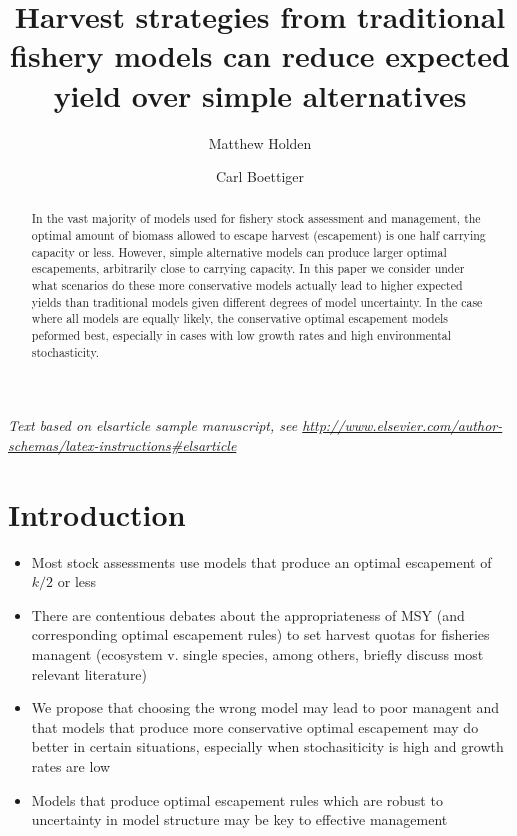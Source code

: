 \documentclass[]{elsarticle} %
\begin{document}
\begin{frontmatter}

  \title{Harvest strategies from traditional fishery models can reduce expected yield over simple alternatives}
    \author[CEED,UQ]{Matthew Holden}
    \author[UCB]{Carl Boettiger}
	\address[CEED]{ARC Centre of Excellence for Environmental Decisions, University of
		Queensland, Brisbane, QLD, 4072, Australia}
    \address[UQ]{Centre for Biodiversity and Conservation Science, University of Queensland, School of Biology, Brisbane, QLD, 4072, Australia}
    \address[UCB]{University of California Berkeley}
  
  \begin{abstract}
  In the vast majority of models used for fishery stock assessment and management, the optimal amount of biomass allowed to escape harvest (escapement) is one half carrying capacity or less. However, simple alternative models can produce larger optimal escapements, arbitrarily close to carrying capacity. In this paper we consider under what scenarios do these more conservative models actually lead to higher expected yields than traditional models given different degrees of model uncertainty. In the case where all models are equally likely, the conservative optimal escapement models peformed best, especially in cases with low growth rates and high environmental stochasticity.  
  \end{abstract}
  
 \end{frontmatter}

\emph{Text based on elsarticle sample manuscript, see
\url{http://www.elsevier.com/author-schemas/latex-instructions\#elsarticle}}

\section{Introduction}

\begin{itemize}
	\item Most stock assessments use models that produce an optimal escapement of $k/2$ or less
	\item There are contentious debates about the appropriateness of MSY (and corresponding optimal escapement rules) to set harvest quotas for fisheries managent (ecosystem v. single species, among others, briefly discuss most relevant literature)
	\item We propose that choosing the wrong model may lead to poor managent and that models that produce more conservative optimal escapement may do better in certain situations, especially when stochasiticity is high and growth rates are low
	\item Models that produce optimal escapement rules which are robust to uncertainty in model structure may be key to effective management
\end{itemize}
\end{document}
